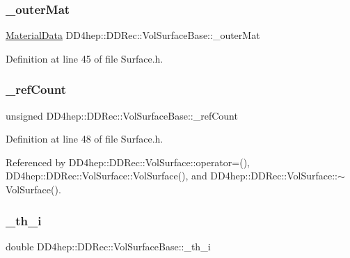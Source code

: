 \subsubsection{\texorpdfstring{\+\_\+outer\+Mat}{\_outerMat}}
{\footnotesize\ttfamily \hyperlink{class_d_d4hep_1_1_d_d_rec_1_1_material_data}{Material\+Data} D\+D4hep\+::\+D\+D\+Rec\+::\+Vol\+Surface\+Base\+::\+\_\+outer\+Mat\hspace{0.3cm}{\ttfamily [protected]}}



Definition at line 45 of file Surface.\+h.

\hypertarget{class_d_d4hep_1_1_d_d_rec_1_1_vol_surface_base_a89b8556764cf2684ba0f96dfdd6a674e}{}\label{class_d_d4hep_1_1_d_d_rec_1_1_vol_surface_base_a89b8556764cf2684ba0f96dfdd6a674e} 
\subsubsection{\texorpdfstring{\+\_\+ref\+Count}{\_refCount}}
{\footnotesize\ttfamily unsigned D\+D4hep\+::\+D\+D\+Rec\+::\+Vol\+Surface\+Base\+::\+\_\+ref\+Count\hspace{0.3cm}{\ttfamily [protected]}}



Definition at line 48 of file Surface.\+h.



Referenced by D\+D4hep\+::\+D\+D\+Rec\+::\+Vol\+Surface\+::operator=(), D\+D4hep\+::\+D\+D\+Rec\+::\+Vol\+Surface\+::\+Vol\+Surface(), and D\+D4hep\+::\+D\+D\+Rec\+::\+Vol\+Surface\+::$\sim$\+Vol\+Surface().

\hypertarget{class_d_d4hep_1_1_d_d_rec_1_1_vol_surface_base_a50793721953f298992a3c98f3b77053d}{}\label{class_d_d4hep_1_1_d_d_rec_1_1_vol_surface_base_a50793721953f298992a3c98f3b77053d} 
\subsubsection{\texorpdfstring{\+\_\+th\+\_\+i}{\_th\_i}}
{\footnotesize\ttfamily double D\+D4hep\+::\+D\+D\+Rec\+::\+Vol\+Surface\+Base\+::\+\_\+th\+\_\+i\hspace{0.3cm}{\ttfamily [protected]}}



